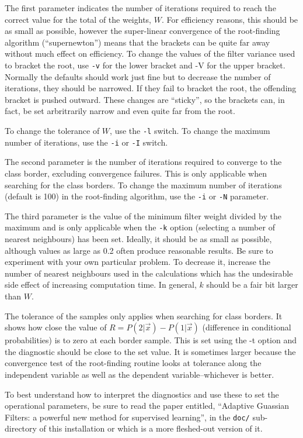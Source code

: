 \documentclass[12pt]{article}
\begin{document}
  The first parameter indicates the number of iterations required to reach the correct value for the total of the weights, $W$.  For efficiency reasons, this should be as small as possible, however the super-linear convergence of the root-finding algorithm (``supernewton'') means that the brackets can be quite far away without much effect on efficiency.  To change the values of the filter variance used to bracket the root, use \verb/-v/ for the lower bracket and -V for the upper bracket.  Normally the defaults should work just fine but to decrease the number of iterations, they should be narrowed.  If they fail to bracket the root, the offending bracket is pushed outward.  These changes are ``sticky'', so the brackets can, in fact, be set arbritrarily narrow and even quite far from the root.

  To change the tolerance of $W$, use the \verb/-l/ switch.  To change the maximum number of iterations, use the \verb/-i/ or \verb/-I/ switch.

  The second parameter is the number of iterations required to converge to the class border, excluding convergence failures.  This is only applicable when searching for the class borders.  To change the maximum number of iterations (default is 100) in the root-finding algorithm, use the \verb/-i/ or \verb/-N/ parameter.

  The third parameter is the value of the minimum filter weight divided by the maximum and is only applicable when the \verb/-k/ option (selecting a number of nearest neighbours) has been set.  Ideally, it should be as small as possible, although values as large as 0.2 often produce reasonable results.  Be sure to experiment with your own particular problem.  To decrease it, increase the number of nearest neighbours used in the calculations which has the undesirable side effect of increasing computation time.  In general, $k$ should be a fair bit larger than $W$.

  The tolerance of the samples only applies when searching for class borders.  It shows how close the value of $R=P(2|\vec x)-P(1|\vec x)$ (difference in conditional probabilities) is to zero at each border sample.  This is set using the -t option and the diagnostic should be close to the set value.  It is sometimes larger because the convergence test of the root-finding routine looks at tolerance along the independent variable as well as the dependent variable--whichever is better.

  To best understand how to interpret the diagnostics and use these to set the operational parameters, be sure to read the paper entitled, ``Adaptive Guassian Filters: a powerful new method for supervised learning'', in the \verb|doc/| sub-directory of this installation or \citet{Mills2011} which is a more fleshed-out version of it.
\end{document}
